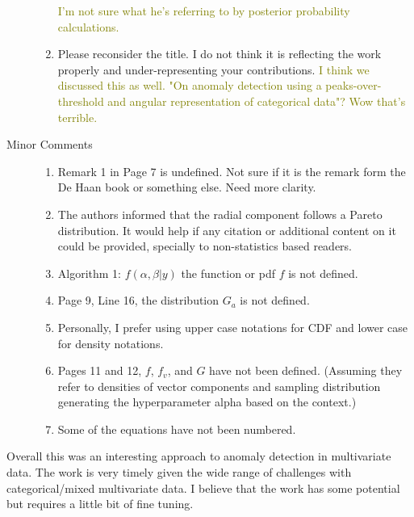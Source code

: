 \documentclass{article}
\newcommand{\comment}[1]{\textcolor{olive}{#1}}
\begin{document}
\begin{description}
\begin{enumerate}
            \comment{I'm not sure what he's referring to by posterior probability calculations.}
        \item Please reconsider the title. I do not think it is reflecting the work properly 
            and under-representing your contributions.
            \comment{I think we discussed this as well.  "On anomaly detection using a peaks-over-threshold and angular representation of categorical data"?  Wow that's terrible.}
    \end{enumerate}
    \item[Minor Comments]
    \begin{enumerate}
        \item Remark 1 in Page 7 is undefined. Not sure if it is the remark form the De Haan book 
            or something else. Need more clarity.
        \item The authors informed that the radial component follows a Pareto distribution. It 
            would help if any citation or additional content on it could be provided, specially 
            to non-statistics based readers. 
        \item Algorithm 1: $f(\alpha, \beta | y)$ the function or pdf $f$ is not defined.
        \item Page 9, Line 16, the distribution $G_a$ is not defined.
        \item Personally, I prefer using upper case notations for CDF and lower case for density
            notations.
        \item Pages 11 and 12, $f$, $f_v$, and $G$ have not been defined. (Assuming they refer to 
            densities of vector components and sampling distribution generating the hyperparameter 
            alpha based on the context.)
        \item Some of the equations have not been numbered. 
    \end{enumerate}
\end{description}

Overall this was an interesting approach to anomaly detection in multivariate data. The work is very timely given the wide range of challenges with categorical/mixed multivariate data. I believe that the work has some potential but requires a little bit of fine tuning.
\end{document}
